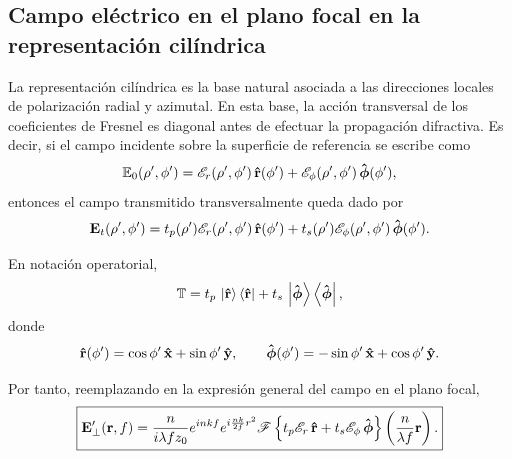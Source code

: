 
\subsection{Campo eléctrico en el plano focal en la representación cilíndrica}

La representación cilíndrica es la base natural asociada a las direcciones locales de polarización radial y azimutal. En esta base, la acción transversal de los coeficientes de Fresnel es diagonal antes de efectuar la propagación difractiva. Es decir, si el campo incidente sobre la superficie de referencia se escribe como
\begin{equation}
  \mathbb E_0(\rho',\phi')
  =
  \mathscr E_r(\rho',\phi')\,\bm{\hat{\mathbf{r}}}(\phi')
  +
  \mathscr E_\phi(\rho',\phi')\,\bm{\hat{\mathbf{\phi}}}(\phi'),
\end{equation}
entonces el campo transmitido transversalmente queda dado por
\begin{equation}
  \vb E_t(\rho',\phi')
  =
  t_p(\rho')\mathscr E_r(\rho',\phi')\,\bm{\hat{\mathbf{r}}}(\phi')
  +
  t_s(\rho')\mathscr E_\phi(\rho',\phi')\,\bm{\hat{\mathbf{\phi}}}(\phi').
  \label{eq:T_cylindrical_basis}
\end{equation}

En notación operatorial,
\begin{equation}
  \mathbb T
  =
  t_p\,\ket{\bm{\hat{\mathbf{r}}}}\bra{\bm{\hat{\mathbf{r}}}}
  +
  t_s\,\ket{\bm{\hat{\mathbf{\phi}}}}\bra{\bm{\hat{\mathbf{\phi}}}},
  \label{eq:M_in_cylindrical_basis}
\end{equation}
donde
\begin{equation}
  \bm{\hat{\mathbf{r}}}(\phi')
  =
  \cos\phi'\,\bm{\hat{\mathbf{x}}}
  +
  \sin\phi'\,\bm{\hat{\mathbf{y}}},
  \qquad
  \bm{\hat{\mathbf{\phi}}}(\phi')
  =
  -\sin\phi'\,\bm{\hat{\mathbf{x}}}
  +
  \cos\phi'\,\bm{\hat{\mathbf{y}}}.
  \label{eq:cylindrical_unit_vectors}
\end{equation}

Por tanto, reemplazando en la expresión general del campo en el plano focal,
\begin{equation}
\boxed{
  \vb E'_\perp(\vb r,f)
  =
  \frac{n}{i\lambda f z_0}
  e^{inkf}
  e^{i\frac{nk}{2f}r^2}
  \mathscr F
  \left\{
    t_p\mathscr E_r\,\bm{\hat{\mathbf{r}}}
    +
    t_s\mathscr E_\phi\,\bm{\hat{\mathbf{\phi}}}
  \right\}
  \left(
    \frac{n}{\lambda f}\vb r
  \right).
}
\label{eq:E_prime_cylindrical_general}
\end{equation}

